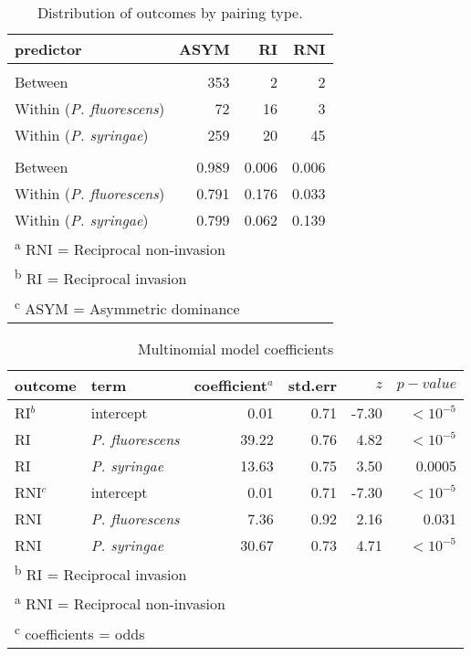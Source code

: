 \newpage
\begin{table}[!ht]

\caption{\label{tab:S2}Distribution of outcomes by pairing type.}
\centering
\fontsize{12}{12}\selectfont
\begin{tabular}[t]{lrrr}
\toprule
predictor & ASYM & RI & RNI\\
\midrule
\addlinespace[0.3em]
\multicolumn{4}{l}{\textbf{Counts}}\\
\hspace{1em}Between & 353 & 2 & 2\\
\hspace{1em}Within (\textit{P. fluorescens}) & 72 & 16 & 3\\
\hspace{1em}Within (\textit{P. syringae}) & 259 & 20 & 45\\
\addlinespace[0.3em]
\multicolumn{4}{l}{\textbf{Frequencies}}\\
\hspace{1em}Between & 0.989 & 0.006 & 0.006\\
\hspace{1em}Within (\textit{P. fluorescens}) & 0.791 & 0.176 & 0.033\\
\hspace{1em}Within (\textit{P. syringae}) & 0.799 & 0.062 & 0.139\\
\bottomrule
\multicolumn{4}{l}{\textsuperscript{a} RNI = Reciprocal non-invasion}\\
\multicolumn{4}{l}{\textsuperscript{b} RI = Reciprocal invasion}\\
\multicolumn{4}{l}{\textsuperscript{c} ASYM = Asymmetric dominance}\\
\end{tabular}
\end{table}
\newpage
\begin{table}[!ht]

\caption{\label{tab:}Multinomial model coefficients}
\centering
\begin{tabular}[t]{llrrrr}
\toprule
outcome & term & coefficient$^{a}$ & std.err & $z$ & $p-value$\\
\midrule
RI$^{b}$ & intercept & 0.01 & 0.71 & -7.30 & $<10^{-5}$\\
RI & \textit{P. fluorescens} & 39.22 & 0.76 & 4.82 & $<10^{-5}$\\
RI & \textit{P. syringae} & 13.63 & 0.75 & 3.50 & 0.0005\\
RNI$^{c}$ & intercept & 0.01 & 0.71 & -7.30 & $<10^{-5}$\\
RNI & \textit{P. fluorescens} & 7.36 & 0.92 & 2.16 & 0.031\\
RNI & \textit{P. syringae} & 30.67 & 0.73 & 4.71 & $<10^{-5}$\\
\bottomrule
\multicolumn{6}{l}{\textsuperscript{b} RI = Reciprocal invasion}\\
\multicolumn{6}{l}{\textsuperscript{a} RNI = Reciprocal non-invasion}\\
\multicolumn{6}{l}{\textsuperscript{c} coefficients = odds}\\
\end{tabular}
\end{table}
